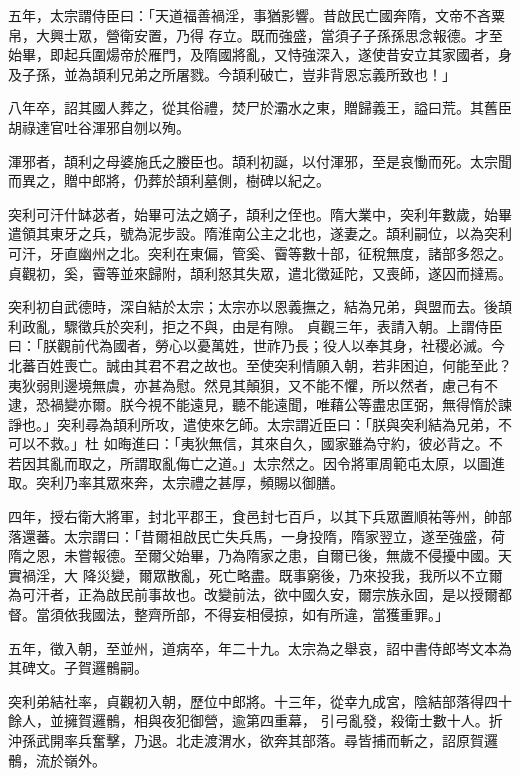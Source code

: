 \begin{pinyinscope}
 五年，太宗謂侍臣曰：「天道福善禍淫，事猶影響。昔啟民亡國奔隋，文帝不吝粟帛，大興士眾，營衛安置，乃得
 存立。既而強盛，當須子子孫孫思念報德。才至始畢，即起兵圍煬帝於雁門，及隋國將亂，又恃強深入，遂使昔安立其家國者，身及子孫，並為頡利兄弟之所屠戮。今頡利破亡，豈非背恩忘義所致也！」



 八年卒，詔其國人葬之，從其俗禮，焚尸於灞水之東，贈歸義王，謚曰荒。其舊臣胡祿達官吐谷渾邪自刎以殉。



 渾邪者，頡利之母婆施氏之媵臣也。頡利初誕，以付渾邪，至是哀慟而死。太宗聞而異之，贈中郎將，仍葬於頡利墓側，樹碑以紀之。



 突利可汗什缽苾者，始畢可法之嫡子，頡利之侄也。隋大業中，突利年數歲，始畢遣領其東牙之兵，號為泥步設。隋淮南公主之北也，遂妻之。頡利嗣位，以為突利可汗，牙直幽州之北。突利在東偏，管奚、霫等數十部，征稅無度，諸部多怨之。貞觀初，奚，霫等並來歸附，頡利怒其失眾，遣北徵延陀，又喪師，遂囚而撻焉。



 突利初自武德時，深自結於太宗；太宗亦以恩義撫之，結為兄弟，與盟而去。後頡利政亂，驟徵兵於突利，拒之不與，由是有隙。
 貞觀三年，表請入朝。上謂侍臣曰：「朕觀前代為國者，勞心以憂萬姓，世祚乃長；役人以奉其身，社稷必滅。今北蕃百姓喪亡。誠由其君不君之故也。至使突利情願入朝，若非困迫，何能至此？夷狄弱則邊境無虞，亦甚為慰。然見其顛狽，又不能不懼，所以然者，慮己有不逮，恐禍變亦爾。朕今視不能遠見，聽不能遠聞，唯藉公等盡忠匡弼，無得惰於諫諍也。」突利尋為頡利所攻，遣使來乞師。太宗謂近臣曰：「朕與突利結為兄弟，不可以不救。」杜
 如晦進曰：「夷狄無信，其來自久，國家雖為守約，彼必背之。不若因其亂而取之，所謂取亂侮亡之道。」太宗然之。因令將軍周範屯太原，以圖進取。突利乃率其眾來奔，太宗禮之甚厚，頻賜以御膳。



 四年，授右衛大將軍，封北平郡王，食邑封七百戶，以其下兵眾置順祐等州，帥部落還蕃。太宗謂曰：「昔爾祖啟民亡失兵馬，一身投隋，隋家翌立，遂至強盛，荷隋之恩，未嘗報德。至爾父始畢，乃為隋家之患，自爾已後，無歲不侵擾中國。天實禍淫，大
 降災變，爾眾散亂，死亡略盡。既事窮後，乃來投我，我所以不立爾為可汗者，正為啟民前事故也。改變前法，欲中國久安，爾宗族永固，是以授爾都督。當須依我國法，整齊所部，不得妄相侵掠，如有所違，當獲重罪。」



 五年，徵入朝，至並州，道病卒，年二十九。太宗為之舉哀，詔中書侍郎岑文本為其碑文。子賀邏鶻嗣。



 突利弟結社率，貞觀初入朝，歷位中郎將。十三年，從幸九成宮，陰結部落得四十餘人，並擁賀邏鶻，相與夜犯御營，逾第四重幕，
 引弓亂發，殺衛士數十人。折沖孫武開率兵奮擊，乃退。北走渡渭水，欲奔其部落。尋皆捕而斬之，詔原賀邏鶻，流於嶺外。




\end{pinyinscope}
